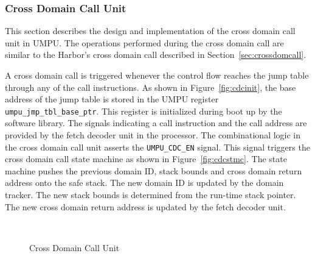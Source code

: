 \subsubsection{Cross Domain Call Unit}
\label{sec:cdcunit}
%
This section describes the design and implementation of the cross domain call unit in UMPU.
%
The operations performed during the cross domain call are similar to
the Harbor's cross domain call described in
Section~\ref{sec:crossdomcall}.
%

A cross domain call is triggered whenever the control flow reaches the
jump table through any of the call instructions.
%
As shown in Figure~\ref{fig:cdcinit}, the base address of the jump
table is stored in the UMPU register
\texttt{umpu\_jmp\_tbl\_base\_ptr}.
%
This register is initialized during boot up by the software library.
%
The signals indicating a call instruction and the call address are
provided by the fetch decoder unit in the processor.
%
The combinational logic in the cross domain call unit asserts the \texttt{UMPU\_CDC\_EN} signal.
%
This signal triggers the cross domain call state machine as shown in Figure~\ref{fig:cdcstmc}.
%
The state machine pushes the previous domain ID, stack bounds and cross domain return address onto the safe stack.
%
The new domain ID is updated by the domain tracker.
%
The new stack bounds is determined from the run-time stack pointer.
%
The new cross domain return address is updated by the fetch decoder unit.
%
\begin{figure}[htpb]
 \centering
  \mbox{
    \hspace{0.2in}
  }
  \caption{Cross Domain Call Unit}
\end{figure}   

